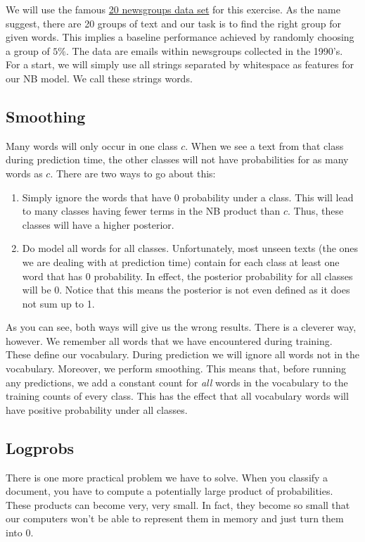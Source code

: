 \documentclass[11pt, a4paper]{article}
\begin{document}
We will use the famous \href{http://qwone.com/~jason/20Newsgroups/}{20 newsgroups data set} for this 
exercise. As the name suggest, there are 20 groups of text and our task is to find the right group for given words. This
implies a baseline performance achieved by randomly choosing a group of $ 5\% $. The data are emails
within newsgroups collected in the 1990's. For a start, we will simply use all strings separated by
whitespace as features for our NB model. We call these strings words.

\subsection{Smoothing}

Many words will only occur in one class $ c $. When we see a text from that class during prediction time, the
other classes will not have probabilities for as many words as $ c $. There are two ways to go about this:
\begin{enumerate}
\item Simply ignore the words that have 0 probability under a class. This will lead to many classes
having fewer terms in the NB product than $ c $. Thus, these classes will have a higher posterior.
\item Do model all words for all classes. Unfortunately, most unseen texts (the ones we are dealing
with at prediction time) contain for each class at least one word that has 0 probability. In effect, the
posterior probability for all classes will be 0. Notice that this means the posterior is not even defined
as it does not sum up to 1.
\end{enumerate} 

As you can see, both ways will give us the wrong results. There is a cleverer way, however. We remember
all words that we have encountered during training. These define our vocabulary. During prediction we
will ignore all words not in the vocabulary. Moreover, we perform smoothing. This means that, before running any predictions, we add a constant count for \textit{all} words in the vocabulary to the training counts
of every class. This has the effect that all vocabulary words will have positive probability under
all classes. 

\subsection{Logprobs}

There is one more practical problem we have to solve. When you classify a document, you have to compute a potentially large product of probabilities. These products can become very, very small. In fact, they become so small that our computers won't be able to 
represent them in memory and just turn them into 0.
\end{document}
